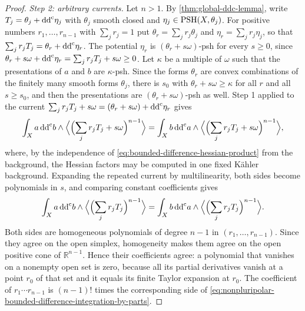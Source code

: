 \begin{proof}
\emph{Step 2: arbitrary currents.} Let $n>1$. By \cref{thm:global-ddc-lemma}, write $T_j=\theta_j+\mathrm{dd}^{\mathrm{c}}\eta_j$ with $\theta_j$ smooth closed and $\eta_j\in\mathrm{PSH}(X,\theta_j)$. For positive numbers $r_1,\ldots,r_{n-1}$ with $\sum_jr_j=1$ put $\theta_r=\sum_jr_j\theta_j$ and $\eta_r=\sum_jr_j\eta_j$, so that $\sum_jr_jT_j=\theta_r+\mathrm{dd}^{\mathrm{c}}\eta_r$. The potential $\eta_r$ is $(\theta_r+s\omega)$-psh for every $s\geq0$, since $\theta_r+s\omega+\mathrm{dd}^{\mathrm{c}}\eta_r=\sum_jr_jT_j+s\omega\geq0$. Let $\kappa$ be a multiple of $\omega$ such that the presentations of $a$ and $b$ are $\kappa$-psh. Since the forms $\theta_r$ are convex combinations of the finitely many smooth forms $\theta_j$, there is $s_0$ with $\theta_r+s\omega\geq\kappa$ for all $r$ and all $s\geq s_0$, and then the presentations are $(\theta_r+s\omega)$-psh as well. Step 1 applied to the current $\sum_jr_jT_j+s\omega=(\theta_r+s\omega)+\mathrm{dd}^{\mathrm{c}}\eta_r$ gives
\[
 \int_Xa\,\mathrm{dd}^{\mathrm{c}} b\wedge\Bigl\langle\Bigl(\sum_jr_jT_j+s\omega\Bigr)^{n-1}\Bigr\rangle
 =\int_Xb\,\mathrm{dd}^{\mathrm{c}} a\wedge\Bigl\langle\Bigl(\sum_jr_jT_j+s\omega\Bigr)^{n-1}\Bigr\rangle,
\]
where, by the independence of \eqref{eq:bounded-difference-hessian-product} from the background, the Hessian factors may be computed in one fixed K\"ahler background. Expanding the repeated current by multilinearity, both sides become polynomials in $s$, and comparing constant coefficients gives
\[
 \int_Xa\,\mathrm{dd}^{\mathrm{c}} b\wedge\Bigl\langle\Bigl(\sum_jr_jT_j\Bigr)^{n-1}\Bigr\rangle
 =\int_Xb\,\mathrm{dd}^{\mathrm{c}} a\wedge\Bigl\langle\Bigl(\sum_jr_jT_j\Bigr)^{n-1}\Bigr\rangle.
\]
Both sides are homogeneous polynomials of degree $n-1$ in $(r_1,\ldots,r_{n-1})$. Since they agree on the open simplex, homogeneity makes them agree on the open positive cone of $\mathbb R^{n-1}$. Hence their coefficients agree: a polynomial that vanishes on a nonempty open set is zero, because all its partial derivatives vanish at a point $r_0$ of that set and it equals its finite Taylor expansion at $r_0$. The coefficient of $r_1\cdots r_{n-1}$ is $(n-1)!$ times the corresponding side of \eqref{eq:nonpluripolar-bounded-difference-integration-by-parts}.
\end{proof}

